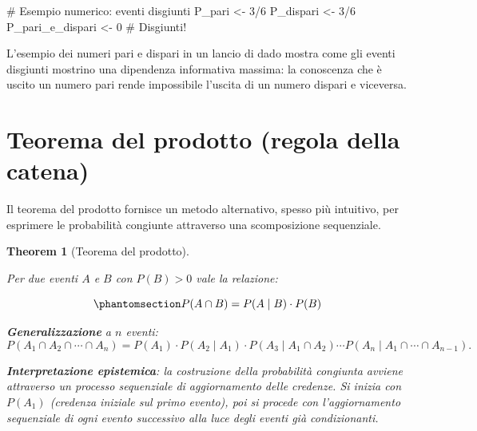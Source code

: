 \documentclass[
  letterpaper,
  DIV=11,
  numbers=noendperiod,
  oneside]{scrreprt}
\newenvironment{Shaded}{\begin{snugshade}}{\end{snugshade}}
\newcommand{\CommentTok}[1]{\textcolor[rgb]{0.37,0.37,0.37}{#1}}
\newcommand{\DecValTok}[1]{\textcolor[rgb]{0.68,0.00,0.00}{#1}}
\newcommand{\NormalTok}[1]{\textcolor[rgb]{0.00,0.23,0.31}{#1}}
\newcommand{\OtherTok}[1]{\textcolor[rgb]{0.00,0.23,0.31}{#1}}
\newcommand{\SpecialCharTok}[1]{\textcolor[rgb]{0.37,0.37,0.37}{#1}}
\theoremstyle{definition}
\theoremstyle{plain}
\newtheorem{theorem}{Theorem}[chapter]
\theoremstyle{definition}
\theoremstyle{remark}
\begin{document}
\begin{Shaded}
\begin{Highlighting}[]
\CommentTok{\# Esempio numerico: eventi disgiunti}
\NormalTok{P\_pari }\OtherTok{\textless{}{-}} \DecValTok{3}\SpecialCharTok{/}\DecValTok{6}
\NormalTok{P\_dispari }\OtherTok{\textless{}{-}} \DecValTok{3}\SpecialCharTok{/}\DecValTok{6}
\NormalTok{P\_pari\_e\_dispari }\OtherTok{\textless{}{-}} \DecValTok{0}  \CommentTok{\# Disgiunti!}
\end{Highlighting}
\end{Shaded}

L'esempio dei numeri pari e dispari in un lancio di dado mostra come gli
eventi disgiunti mostrino una dipendenza informativa massima: la
conoscenza che è uscito un numero pari rende impossibile l'uscita di un
numero dispari e viceversa.

\section{Teorema del prodotto (regola della
catena)}\label{teorema-del-prodotto-regola-della-catena}

Il teorema del prodotto fornisce un metodo alternativo, spesso più
intuitivo, per esprimere le probabilità congiunte attraverso una
scomposizione sequenziale.

\begin{theorem}[Teorema del
prodotto]\protect\hypertarget{thm-product-rule}{}\label{thm-product-rule}

Per due eventi \(A\) e \(B\) con \(P(B) > 0\) vale la relazione:

\begin{equation}\phantomsection\label{eq-product-rule}{
P(A \cap B) = P(A \mid B) \cdot P(B)
}\end{equation}

\textbf{Generalizzazione} a \(n\) eventi: \[
P(A_1 \cap A_2 \cap \cdots \cap A_n) = P(A_1) \cdot P(A_2 \mid A_1) \cdot P(A_3 \mid A_1 \cap A_2) \cdots P(A_n \mid A_1 \cap \cdots \cap A_{n-1}).
\]

\textbf{Interpretazione epistemica}: la costruzione della probabilità
congiunta avviene attraverso un processo sequenziale di aggiornamento
delle credenze. Si inizia con \(P(A_1)\) (credenza iniziale sul primo
evento), poi si procede con l'aggiornamento sequenziale di ogni evento
successivo alla luce degli eventi già condizionanti.

\end{theorem}
\end{document}
